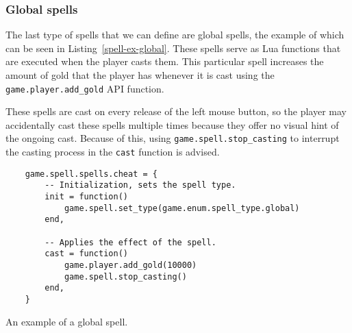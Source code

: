 \subsubsection{Global spells}

The last type of spells that we can define are global spells, the example of which can be seen in Listing~\ref{spell-ex-global}. These
spells serve as Lua functions that are executed when the player casts them. This particular spell increases the amount of gold that the
player has whenever it is cast using the \texttt{game.player.add\_gold} API function.

These spells are cast on every release of the left mouse button, so the player may accidentally cast these spells multiple times because
they offer no visual hint of the ongoing cast. Because of this, using \texttt{game.spell.stop\_casting} to interrupt the casting process
in the \texttt{cast} function is advised.

\begin{listing}
    \centering
    \begin{lstlisting}
    game.spell.spells.cheat = {
        -- Initialization, sets the spell type.
        init = function()
            game.spell.set_type(game.enum.spell_type.global)
        end,
        
        -- Applies the effect of the spell.
        cast = function()
            game.player.add_gold(10000)
            game.spell.stop_casting()
        end,
    }
    \end{lstlisting}
    \caption{An example of a global spell.}
    \label{spell-ex-global}
\end{listing}
